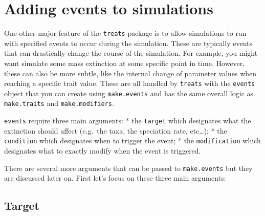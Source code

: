 \documentclass[
]{book}
\begin{document}
\hypertarget{makeevents}{%
\chapter{Adding events to simulations}\label{makeevents}}

One other major feature of the \texttt{treats} package is to allow simulations to run with specified events to occur during the simulation.
These are typically events that can drastically change the course of the simulation.
For example, you might want simulate some mass extinction at some specific point in time.
However, these can also be more subtle, like the internal change of parameter values when reaching a specific trait value.
These are all handled by \texttt{treats} with the \texttt{events} object that you can create using \texttt{make.events} and has the same overall logic as \texttt{make.traits} and \texttt{make.modifiers}.

\texttt{events} require three main arguments:
* the \texttt{target} which designates what the extinction should affect (e.g.~the taxa, the speciation rate, etc\ldots);
* the \texttt{condition} which designates when to trigger the event;
* the \texttt{modification} which designates what to exactly modify when the event is triggered.

There are several more arguments that can be passed to \texttt{make.events} but they are discussed later on.
First let's focus on these three main arguments:

\hypertarget{target}{%
\section{Target}\label{target}}
\end{document}
